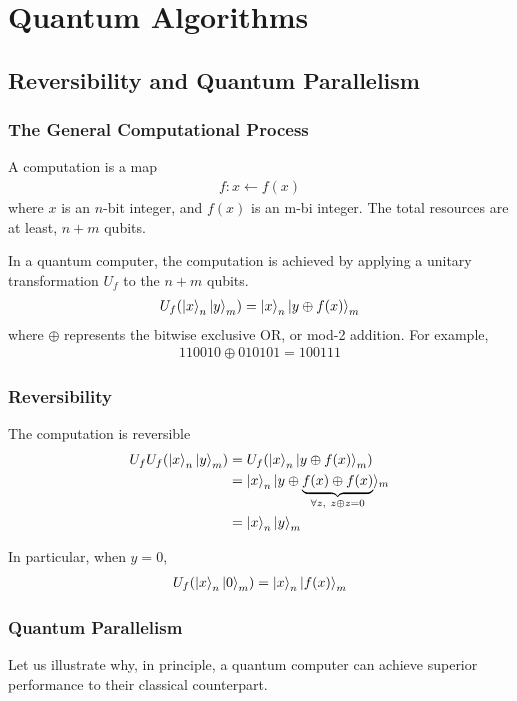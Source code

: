 \newpage
\section{Quantum Algorithms}

\subsection{Reversibility and Quantum Parallelism}

\subsubsection{The General Computational Process}
A computation is a map
\begin{align*}
    f: x\leftarrow f(x)
\end{align*}
where $x$ is an $n$-bit integer, and $f(x)$ is an m-bi integer. The total resources are at least, $n+m$ qubits. 

In a quantum computer, the computation is achieved by applying a unitary transformation $U_f$ to the $n+m$ qubits. 
\begin{align*}
    U_f(\ket{x}_n\ket{y}_m)=\ket{x}_n\ket{y\oplus f(x)}_m
\end{align*}
where $\oplus$ represents the bitwise exclusive OR, or mod-2 addition. For example,
\begin{align*}
    110010\oplus 010101=100111
\end{align*}

\subsubsection{Reversibility}
The computation is reversible
\begin{align*}
    U_f U_f (\ket{x}_n\ket{y}_m)&=U_f (\ket{x}_n\ket{y\oplus f(x)}_m)\\
    &=\ket{x}_n | y\oplus \underbrace{f(x) \oplus f(x)}_{\forall z,\ z\oplus z=0} \rangle_m\\
    &=\ket{x}_n\ket{y}_m 
\end{align*}

In particular, when $y=0$,
\begin{align*}
    U_f(\ket{x}_n\ket{0}_m)=\ket{x}_n\ket{f(x)}_m
\end{align*}

\subsubsection{Quantum Parallelism}
Let us illustrate why, in principle, a quantum computer can achieve superior performance to their classical counterpart.

